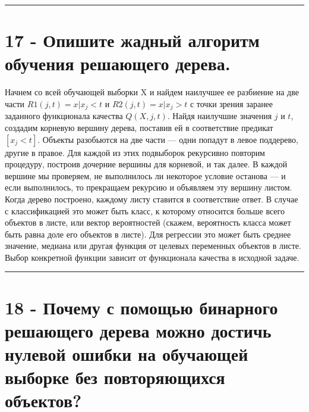 \documentclass[11pt]{article}
\begin{document}
    \begin{center}\rule{0.5\linewidth}{\linethickness}\end{center}

    \section{17 - Опишите жадный алгоритм обучения решающего
дерева.}\label{ux43eux43fux438ux448ux438ux442ux435-ux436ux430ux434ux43dux44bux439-ux430ux43bux433ux43eux440ux438ux442ux43c-ux43eux431ux443ux447ux435ux43dux438ux44f-ux440ux435ux448ux430ux44eux449ux435ux433ux43e-ux434ux435ux440ux435ux432ux430.}

Начнем со всей обучающей выборки X и найдем наилучшее ее разбиение на
две части \(R1(j, t) = {x | x_j < t}\) и \(R2(j, t) = {x | x_j > t}\) с
точки зрения заранее заданного функционала качества \(Q(X, j, t)\).
Найдя наилучшие значения \(j\) и \(t\), создадим корневую вершину
дерева, поставив ей в соответствие предикат \([x_j < t]\). Объекты
разобьются на две части --- одни попадут в левое поддерево, другие в
правое. Для каждой из этих подвыборок рекурсивно повторим процедуру,
построив дочерние вершины для корневой, и так далее. В каждой вершине мы
проверяем, не выполнилось ли некоторое условие останова --- и если
выполнилось, то прекращаем рекурсию и объявляем эту вершину листом.
Когда дерево построено, каждому листу ставится в соответствие ответ. В
случае с классификацией это может быть класс, к которому относится
больше всего объектов в листе, или вектор вероятностей (скажем,
вероятность класса может быть равна доле его объектов в листе). Для
регрессии это может быть среднее значение, медиана или другая функция от
целевых переменных объектов в листе. Выбор конкретной функции зависит от
функционала качества в исходной задаче.

    \begin{center}\rule{0.5\linewidth}{\linethickness}\end{center}

    \section{18 - Почему с помощью бинарного решающего дерева можно достичь
нулевой ошибки на обучающей выборке без повторяющихся
объектов?}\label{ux43fux43eux447ux435ux43cux443-ux441-ux43fux43eux43cux43eux449ux44cux44e-ux431ux438ux43dux430ux440ux43dux43eux433ux43e-ux440ux435ux448ux430ux44eux449ux435ux433ux43e-ux434ux435ux440ux435ux432ux430-ux43cux43eux436ux43dux43e-ux434ux43eux441ux442ux438ux447ux44c-ux43dux443ux43bux435ux432ux43eux439-ux43eux448ux438ux431ux43aux438-ux43dux430-ux43eux431ux443ux447ux430ux44eux449ux435ux439-ux432ux44bux431ux43eux440ux43aux435-ux431ux435ux437-ux43fux43eux432ux442ux43eux440ux44fux44eux449ux438ux445ux441ux44f-ux43eux431ux44aux435ux43aux442ux43eux432}
\end{document}
